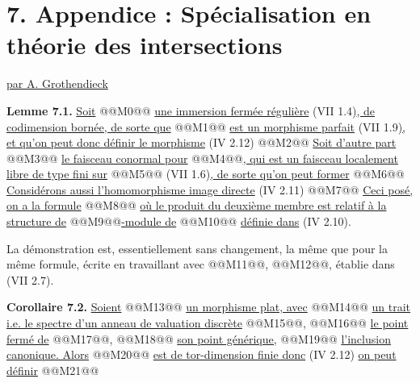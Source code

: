 
\section*{7. Appendice : Spécialisation en théorie des intersections}
\begin{center}
\underline{par A. Grothendieck}
\end{center}

\textbf{Lemme 7.1.} \uline{Soit} @@M0@@ \uline{une immersion fermée régulière} (VII 1.4)\uline{, de codimension bornée, de sorte que} @@M1@@ \uline{est un morphisme parfait} (VII 1.9)\uline{, et qu'on peut donc définir le morphisme} (IV 2.12)
@@M2@@
\uline{Soit d'autre part} @@M3@@ \uline{le faisceau conormal pour} @@M4@@\uline{, qui est un faisceau localement libre de type fini sur} @@M5@@ (VII 1.6)\uline{, de sorte qu'on peut former}
@@M6@@
\uline{Considérons aussi l'homomorphisme image directe} (IV 2.11)
@@M7@@
\uline{Ceci posé, on a la formule}
@@M8@@
\uline{où le produit du deuxième membre est relatif à la structure de} @@M9@@\uline{-module de} @@M10@@ \uline{définie dans} (IV 2.10).

La démonstration est, essentiellement sans changement, la même que pour la même formule, écrite en travaillant avec @@M11@@, @@M12@@, établie dans (VII 2.7).

\textbf{Corollaire 7.2.} \uline{Soient} @@M13@@ \uline{un morphisme plat, avec} @@M14@@ \uline{un trait i.e. le spectre d'un anneau de valuation discrète} @@M15@@, @@M16@@ \uline{le point fermé de} @@M17@@, @@M18@@ \uline{son point générique,} @@M19@@ \uline{l'inclusion canonique. Alors} @@M20@@ \uline{est de tor-dimension finie donc} (IV 2.12) \uline{on peut définir}
@@M21@@
